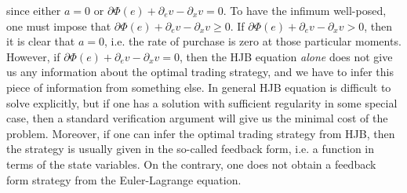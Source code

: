 \documentclass[openany,oneside]{article}
\theoremstyle{definition}
\theoremstyle{remark}
\begin{document}
since either $a=0$ or $\partial \Phi(e) + \partial_e v - \partial_x v = 0$. To have the infimum well-posed, one must impose that $\partial \Phi(e) + \partial_e v - \partial_x v \ge 0$. If $\partial \Phi(e) + \partial_e v - \partial_x v > 0$, then it is clear that $a=0$, i.e. the rate of purchase is zero at those particular moments. However, if $\partial \Phi(e) + \partial_e v - \partial_x v = 0$, then the HJB equation \emph{alone} does not give us any information about the optimal trading strategy, and we have to infer this piece of information from something else. In general HJB equation is difficult to solve explicitly, but if one has a solution with sufficient regularity in some special case, then a standard verification argument will give us the minimal cost of the problem. Moreover, if one can infer the optimal trading strategy from HJB, then the strategy is usually given in the so-called feedback form, i.e. a function in terms of the state variables. On the contrary, one does not obtain a feedback form strategy from the Euler-Lagrange equation.
\end{document}

